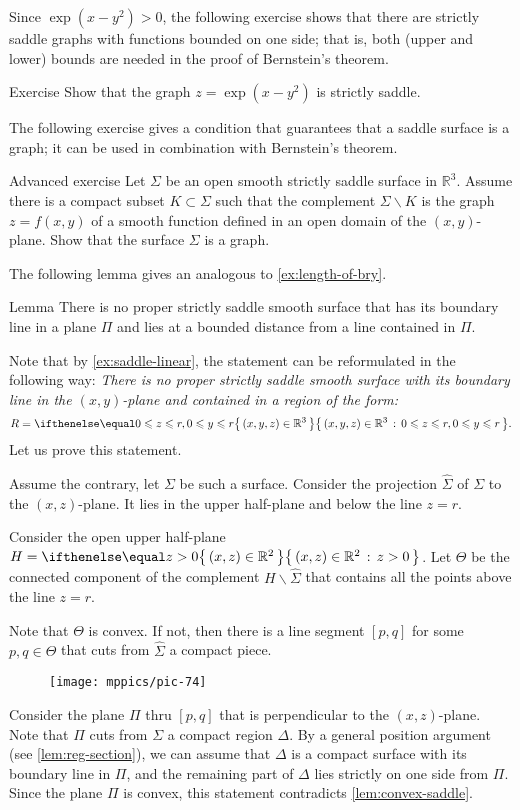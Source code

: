 Since $\exp(x-y^2)>0$,
the following exercise shows that there are strictly saddle graphs with functions bounded on one side;
that is, both (upper and lower) bounds are needed in the proof of Bernstein's theorem.

\begin{thm}{Exercise}\label{ex:one-side-bernshtein}
Show that the graph
$z=\exp(x-y^2)$
is strictly saddle.
\end{thm}

The following exercise gives a condition that guarantees that a saddle surface is a graph;
it can be used in combination with Bernstein's theorem.

\begin{thm}{Advanced exercise}\label{ex:saddle-graph}
Let $\Sigma$ be an open smooth strictly saddle surface in $\mathbb{R}^3$.
Assume there is a compact subset $K\subset \Sigma$ such that the complement $\Sigma\backslash K$ is the graph $z=f(x,y)$ of a smooth function defined in an open domain of the $(x,y)$-plane.
Show that the surface $\Sigma$ is a graph.
\end{thm}

The following lemma gives an analogous to \ref{ex:length-of-bry}.

\begin{thm}{Lemma}\label{lem:region}
There is no proper strictly saddle smooth surface that has its boundary line in a plane $\Pi$ and lies at a bounded distance from a line contained in $\Pi$.
\end{thm}

Note that by \ref{ex:saddle-linear}, the statement can be reformulated in the following way:
\textit{There is no proper strictly saddle smooth surface 
with its boundary line in the $(x,y)$-plane
and contained in a region of the form:}
\[R=\set{(x,y,z)\in\mathbb{R}^3}{0\le z\le r, 0\le y\le r}.\]
Let us prove this statement.

Assume the contrary, let $\Sigma$ be such a surface.
Consider the projection $\hat \Sigma$ of $\Sigma$ to the $(x,z)$-plane.
It lies in the upper half-plane and below the line $z=r$.

Consider the open upper half-plane $H=\set{(x,z)\in \mathbb{R}^2}{z> 0}$. 
Let $\Theta$ be the connected component of the complement $H\backslash \hat \Sigma$ that contains all the points above the line $z=r$.

Note that $\Theta$ is convex.
If not, then there is a line segment $[p,q]$ for some $p,q\in \Theta$ that cuts from $\hat\Sigma$ a compact piece.
\begin{figure}[!ht]
\vskip-0mm
\centering
\texttt{[image: mppics/pic-74]}
\vskip0mm
\end{figure}
Consider the plane $\Pi$ thru $[p,q]$ that is perpendicular to the $(x,z)$-plane.
Note that $\Pi$ cuts from $\Sigma$ a compact region $\Delta$.
By a general position argument (see \ref{lem:reg-section}),
we can assume that $\Delta$ is a compact surface with its boundary line in $\Pi$, and the remaining part of $\Delta$ lies strictly on one side from $\Pi$.
Since the plane $\Pi$ is convex, this statement contradicts \ref{lem:convex-saddle}.

